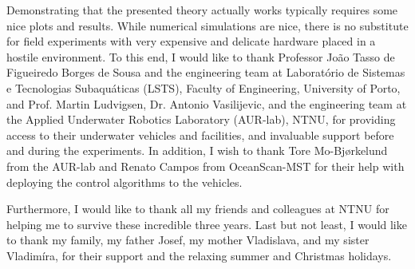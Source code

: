 Demonstrating that the presented theory actually works typically requires some nice plots and results.
While numerical simulations are nice, there is no substitute for field experiments with very expensive and delicate hardware placed in a hostile environment.
To this end, I would like to thank Professor Jo\~{a}o Tasso de Figueiredo Borges de Sousa and the engineering team at Laborat\'{o}rio de Sistemas e Tecnologias Subaqu\'{a}ticas (LSTS), Faculty of Engineering, University of Porto, and Prof. Martin Ludvigsen, Dr. Antonio Vasilijevic, and the engineering team at the Applied Underwater Robotics Laboratory (AUR-lab), NTNU, for providing access to their underwater vehicles and facilities, and invaluable support before and during the experiments. 
In addition, I wish to thank Tore Mo-Bjørkelund from the AUR-lab and Renato Campos from OceanScan-MST for their help with deploying the control algorithms to the vehicles.

Furthermore, I would like to thank all my friends and colleagues at NTNU for helping me to survive these incredible three years.
Last but not least, I would like to thank my family, my father Josef, my mother Vladislava, and my sister Vladim\'{i}ra, for their support and the relaxing summer and Christmas holidays.
